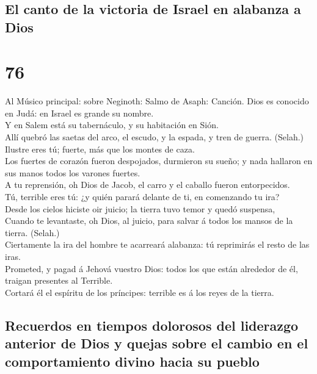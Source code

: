 \hypertarget{el-canto-de-la-victoria-de-israel-en-alabanza-a-dios}{%
\subsection{El canto de la victoria de Israel en alabanza a
Dios}\label{el-canto-de-la-victoria-de-israel-en-alabanza-a-dios}}

\hypertarget{section-75}{%
\section{76}\label{section-75}}

 Al Músico principal: sobre Neginoth: Salmo de Asaph:
Canción. Dios es conocido en Judá: en Israel es grande su nombre.\\
 Y en Salem está su tabernáculo, y su habitación en
Sión.\\
 Allí quebró las saetas del arco, el escudo, y la espada,
y tren de guerra. (Selah.)\\
 Ilustre eres tú; fuerte, más que los montes de caza.\\
 Los fuertes de corazón fueron despojados, durmieron su
sueño; y nada hallaron en sus manos todos los varones fuertes.\\
 A tu reprensión, oh Dios de Jacob, el carro y el caballo
fueron entorpecidos.\\
 Tú, terrible eres tú: ¿y quién parará delante de ti, en
comenzando tu ira?\\
 Desde los cielos hiciste oir juicio; la tierra tuvo temor
y quedó suspensa,\\
 Cuando te levantaste, oh Dios, al juicio, para salvar á
todos los mansos de la tierra. (Selah.)\\
 Ciertamente la ira del hombre te acarreará alabanza: tú
reprimirás el resto de las iras.\\
 Prometed, y pagad á Jehová vuestro Dios: todos los que
están alrededor de él, traigan presentes al Terrible.\\
 Cortará él el espíritu de los príncipes: terrible es á
los reyes de la tierra.

\hypertarget{recuerdos-en-tiempos-dolorosos-del-liderazgo-anterior-de-dios-y-quejas-sobre-el-cambio-en-el-comportamiento-divino-hacia-su-pueblo}{%
\subsection{Recuerdos en tiempos dolorosos del liderazgo anterior de
Dios y quejas sobre el cambio en el comportamiento divino hacia su
pueblo}\label{recuerdos-en-tiempos-dolorosos-del-liderazgo-anterior-de-dios-y-quejas-sobre-el-cambio-en-el-comportamiento-divino-hacia-su-pueblo}}

